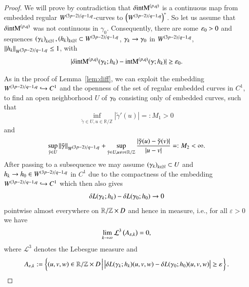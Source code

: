 \begin{proof}
We will prove by contradiction that $\delta \mathrm{intM}^{(p,q)}$
is a continuous map from embedded regular $W^{\scriptstyle (3p-2)/q-1,q}$-curves
to $\left(W^{\scriptstyle (3p-2)/q-1,q}\right)^\ast$.
So let us assume that $\delta \mathrm{intM}^{(p,q)}$%
was not continuous in $\gamma_{0}$.
Consequently, there are some $\varepsilon_{0}>0$ and sequences $\left({\gamma}_{k}\right)_{k\in\mathbb{N}},\left({h}_{k}\right)_{k\in\mathbb{N}}\subset W^{\scriptstyle (3p-2)/q-1,q}$,
$\gamma_k\to\gamma_{0}$ in $W^{\scriptstyle (3p-2)/q-1,q}$, $\left\|h_{k}\right\|_{W^{\scriptstyle (3p-2)/q-1,q}}\le1$, with
\begin{equation}\label{eq:contrassumpt}
 |\delta \mathrm{intM}^{(p,q)}(\gamma_k; h_k) - \mathrm{intM}^{(p,q)} (\gamma;h_k)| \geq \varepsilon_0.
\end{equation}

As in the proof of Lemma~\ref{lem:diff}, we can exploit the embedding $W^{\scriptstyle (3p-2)/q-1,q} \hookrightarrow C^1$ and the openness of the set of regular embedded curves in $C^1$,
to find an open neighborhood $U$ of $\gamma_{0}$ consisting only of embedded curves, such that
\begin{equation*}
 \inf_{\tilde \gamma \in U, u \in \mathbb R / \mathbb Z} |\tilde \gamma '(u)| =: M_1 >0 
\end{equation*}
and
\begin{equation*}
 \sup_{\tilde \gamma \in U} \|\tilde \gamma\|_{W^{\scriptstyle (3p-2)/q-1,q}} +\sup_{\tilde \gamma \in U, u\not=v \in \mathbb R / \mathbb Z} \frac {|\tilde \gamma(u) - \tilde \gamma(v)|}{|u-v|} =: M_2 < \infty. 
\end{equation*}
After passing to a subsequence
we may assume $\left({\gamma}_{k}\right)_{k\in\mathbb{N}}\subset U$ and $h_{k}\to h_{0}\in W^{\scriptstyle (3p-2)/q-1,q}$ in $C^{1}$
due to the compactness of the embedding $W^{\scriptstyle (3p-2)/q-1,q} \hookrightarrow C^1$
which then also gives
\begin{equation*}
 \delta L(\gamma_k;h_k) - \delta L(\gamma_0;h_0) \rightarrow 0
\end{equation*}
pointwise almost everywhere on $\mathbb{R}/\mathbb{Z}\times D$ and hence in measure, i.e., for all $\varepsilon >0$ we have
\begin{equation}\label{eq:lebto0}
 \lim_{k \rightarrow \infty} \mathcal L^3 \left(A_{\varepsilon,k}\right)=0,
\end{equation}
where $\mathcal L^3$ denotes the Lebesgue measure
and
\begin{equation*}\delimitershortfall-1pt
 A_{\eps,k}:= \sett{(u,v,w) \in \mathbb R / \mathbb Z \times D}
 {\abs{\delta L(\g_k;h_k)(u,v,w)-\delta L(\g_0;h_0)(u,v,w)} \geq \varepsilon}. 
\end{equation*}


\end{proof}

